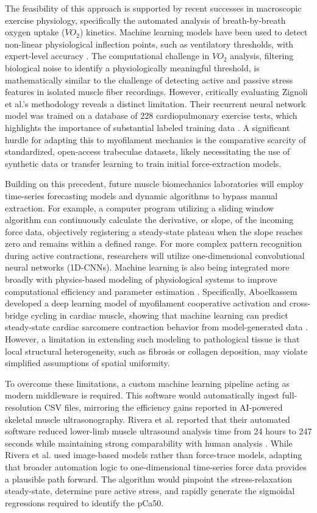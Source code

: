 \documentclass[jou]{apa7}
\begin{document}
The feasibility of this approach is supported by recent successes in macroscopic exercise physiology, specifically the automated analysis of breath-by-breath oxygen uptake ($VO_2$) kinetics. Machine learning models have been used to detect non-linear physiological inflection points, such as ventilatory thresholds, with expert-level accuracy \parencite{Zignoli2019}. The computational challenge in $VO_2$ analysis, filtering biological noise to identify a physiologically meaningful threshold, is mathematically similar to the challenge of detecting active and passive stress features in isolated muscle fiber recordings. However, critically evaluating Zignoli et al.'s methodology reveals a distinct limitation. Their recurrent neural network model was trained on a database of 228 cardiopulmonary exercise tests, which highlights the importance of substantial labeled training data \parencite{Zignoli2019}. A significant hurdle for adapting this to myofilament mechanics is the comparative scarcity of standardized, open-access trabeculae datasets, likely necessitating the use of synthetic data or transfer learning to train initial force-extraction models.

Building on this precedent, future muscle biomechanics laboratories will employ time-series forecasting models and dynamic algorithms to bypass manual extraction. For example, a computer program utilizing a sliding window algorithm can continuously calculate the derivative, or slope, of the incoming force data, objectively registering a steady-state plateau when the slope reaches zero and remains within a defined range. For more complex pattern recognition during active contractions, researchers will utilize one-dimensional convolutional neural networks (1D-CNNs). Machine learning is also being integrated more broadly with physics-based modeling of physiological systems to improve computational efficiency and parameter estimation \parencite{Lee2025}. Specifically, Aboelkassem developed a deep learning model of myofilament cooperative activation and cross-bridge cycling in cardiac muscle, showing that machine learning can predict steady-state cardiac sarcomere contraction behavior from model-generated data \parencite{Aboelkassem2025}. However, a limitation in extending such modeling to pathological tissue is that local structural heterogeneity, such as fibrosis or collagen deposition, may violate simplified assumptions of spatial uniformity.

To overcome these limitations, a custom machine learning pipeline acting as modern middleware is required. This software would automatically ingest full-resolution CSV files, mirroring the efficiency gains reported in AI-powered skeletal muscle ultrasonography. Rivera et al. reported that their automated software reduced lower-limb muscle ultrasound analysis time from 24 hours to 247 seconds while maintaining strong comparability with human analysis \parencite{Rivera2025}. While Rivera et al. used image-based models rather than force-trace models, adapting that broader automation logic to one-dimensional time-series force data provides a plausible path forward. The algorithm would pinpoint the stress-relaxation steady-state, determine pure active stress, and rapidly generate the sigmoidal regressions required to identify the pCa50.
\end{document}
